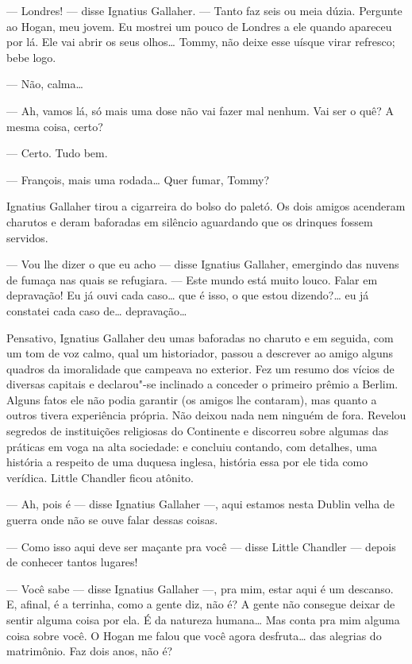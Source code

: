 --- Londres! --- disse Ignatius Gallaher.  --- Tanto faz seis ou meia dúzia.
Pergunte ao Hogan, meu jovem.  Eu mostrei um pouco de Londres a ele quando
apareceu por lá.  Ele vai abrir os seus olhos\ldots{}  Tommy, não deixe esse
uísque virar refresco; bebe logo.

--- Não, calma\ldots{}

--- Ah, vamos lá, só mais uma dose não vai fazer mal nenhum.  Vai ser o quê? A
mesma coisa, certo?

--- Certo.  Tudo bem.

--- François, mais uma rodada\ldots{} Quer fumar, Tommy?

Ignatius Gallaher tirou a cigarreira do bolso do paletó.  Os dois amigos
acenderam charutos e deram baforadas em silêncio aguardando que os drinques
fossem servidos.

--- Vou lhe dizer o que eu acho --- disse Ignatius Gallaher, emergindo das
nuvens de fumaça nas quais se refugiara.  --- Este mundo está muito louco.
Falar em depravação!  Eu já ouvi cada caso\ldots{} que é isso, o que estou
dizendo?\ldots{} eu já constatei cada caso de\ldots{} depravação\ldots{}

Pensativo, Ignatius Gallaher deu umas baforadas no charuto e em seguida, com um
tom de voz calmo, qual um historiador, passou a descrever ao amigo alguns
quadros da imoralidade que campeava no exterior.  Fez um resumo dos vícios de
diversas capitais e declarou"-se inclinado a conceder o primeiro prêmio a
Berlim.  Alguns fatos ele não podia garantir (os amigos lhe contaram), mas
quanto a outros tivera experiência própria.  Não deixou nada nem ninguém de
fora.  Revelou segredos de instituições religiosas do Continente e discorreu
sobre algumas das práticas em voga na alta sociedade: e concluiu contando, com
detalhes, uma história a respeito de uma duquesa inglesa, história essa por ele
tida como verídica.  Little Chandler ficou atônito.

--- Ah, pois é --- disse Ignatius Gallaher ---, aqui estamos nesta Dublin velha
de guerra onde não se ouve falar dessas coisas.

--- Como isso aqui deve ser maçante pra você --- disse Little Chandler ---
depois de conhecer tantos lugares!

--- Você sabe --- disse Ignatius Gallaher ---, pra mim, estar aqui é um
descanso.  E, afinal, é a terrinha, como a gente diz, não é?  A gente não
consegue deixar de sentir alguma coisa por ela.  É da natureza humana\ldots{}
Mas conta pra mim alguma coisa sobre você.  O Hogan me falou que você agora
desfruta\ldots{} das alegrias do matrimônio.  Faz dois anos, não é?

